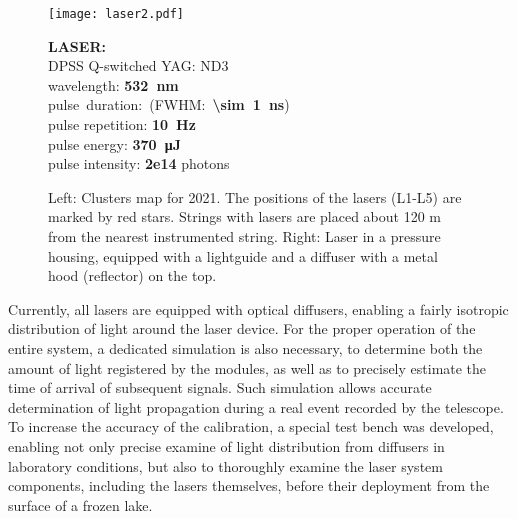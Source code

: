 \documentclass[a4paper,11pt]{article}
\begin{document}
\begin{figure}[H]
	\vspace*{-2ex}
\begin{minipage}{0.75\textwidth}%
	\texttt{[image: laser2.pdf]}
\end{minipage}%
\hspace*{1ex}
\begin{minipage}{0.3\textwidth}
				
				\flushleft
				\scriptsize
				\textbf{LASER:}\\\vspace*{1ex}
				DPSS Q-switched YAG: ND3\\
				wavelength: {\color{green}\textbf{\SI{532}{\nano \meter}}}\\
				\mbox{pulse~duration:~(FWHM:~\textbf{\SI{\sim 1}{ns}})}\\
				pulse repetition: \textbf{\SI{10}{\hertz}}\\
				pulse energy: \textbf{\SI{370}{\micro \joule}}\\
				pulse intensity: \textbf{2e14} photons\\
\end{minipage}
\caption{Left: Clusters map for 2021. The positions of the lasers (L1-L5) are marked by red stars. Strings with lasers are placed about 120 m from the nearest instrumented string. Right: Laser in a pressure housing, equipped with a lightguide and a diffuser with a metal hood (reflector) on the top.}
\label{fig:laser_description}
\vspace*{-2ex}
\end{figure}
%
Currently, all lasers are equipped with optical diffusers, enabling a fairly isotropic distribution of
light around the laser device. For the proper operation of the entire system, a dedicated simulation
is also necessary, to determine both the amount of light registered by the modules, as well as
to precisely estimate the time of arrival of subsequent signals. Such simulation allows accurate determination of light propagation during a real event recorded by the telescope. 
%
To increase the accuracy of the calibration, a special test bench was developed, enabling not only precise examine of light distribution from diffusers
in laboratory conditions, but also to thoroughly examine the laser system components, including the lasers themselves, before their deployment from the surface of a frozen lake.
\end{document}
